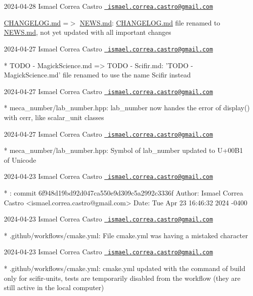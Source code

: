 2024-\/04-\/28 Ismael Correa Castro \href{mailto:ismael.correa.castro@gmail.com}{\texttt{ ismael.\+correa.\+castro@gmail.\+com}}


\begin{DoxyItemize}
\item \mbox{\hyperlink{CHANGELOG_8md}{CHANGELOG.\+md}} =$>$ \mbox{\hyperlink{NEWS_8md}{NEWS.\+md}}\+: \mbox{\hyperlink{CHANGELOG_8md}{CHANGELOG.\+md}} file renamed to \mbox{\hyperlink{NEWS_8md}{NEWS.\+md}}, not yet updated with all important changes
\end{DoxyItemize}

2024-\/04-\/27 Ismael Correa Castro \href{mailto:ismael.correa.castro@gmail.com}{\texttt{ ismael.\+correa.\+castro@gmail.\+com}} \begin{DoxyVerb}* TODO - MagickScience.md => TODO - Scifir.md: 'TODO -
MagickScience.md' file renamed to use the name Scifir instead
\end{DoxyVerb}
 2024-\/04-\/27 Ismael Correa Castro \href{mailto:ismael.correa.castro@gmail.com}{\texttt{ ismael.\+correa.\+castro@gmail.\+com}} \begin{DoxyVerb}* meca_number/lab_number.hpp: lab_number now handes the error of
display() with cerr, like scalar_unit classes
\end{DoxyVerb}
 2024-\/04-\/27 Ismael Correa Castro \href{mailto:ismael.correa.castro@gmail.com}{\texttt{ ismael.\+correa.\+castro@gmail.\+com}} \begin{DoxyVerb}* meca_number/lab_number.hpp: Symbol of lab_number updated to U+00B1
of Unicode
\end{DoxyVerb}
 2024-\/04-\/23 Ismael Correa Castro \href{mailto:ismael.correa.castro@gmail.com}{\texttt{ ismael.\+correa.\+castro@gmail.\+com}} \begin{DoxyVerb}* : commit 6f948d19bd92d047ca550e9d309c5a2992c3336f Author: Ismael
Correa Castro <ismael.correa.castro@gmail.com> Date:   Tue Apr 23
16:46:32 2024 -0400
\end{DoxyVerb}
 2024-\/04-\/23 Ismael Correa Castro \href{mailto:ismael.correa.castro@gmail.com}{\texttt{ ismael.\+correa.\+castro@gmail.\+com}} \begin{DoxyVerb}* .github/workflows/cmake.yml: File cmake.yml was having a mistaked
character
\end{DoxyVerb}
 2024-\/04-\/23 Ismael Correa Castro \href{mailto:ismael.correa.castro@gmail.com}{\texttt{ ismael.\+correa.\+castro@gmail.\+com}} \begin{DoxyVerb}* .github/workflows/cmake.yml: cmake.yml updated with the command of
build only for scifir-units, tests are temporarily disabled from the
workflow (they are still active in the local computer)
\end{DoxyVerb}
